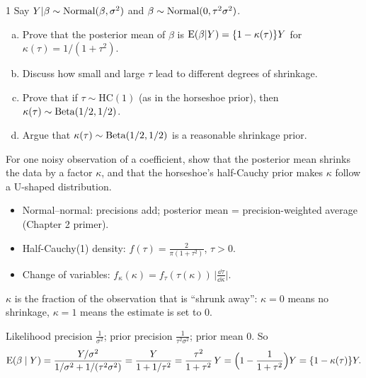 \documentclass[11pt]{article}
\begin{document}
\begin{problem}{1}
Say $Y|\beta\sim\mathrm{Normal}(\beta,\sigma^2)$ and $\beta\sim\mathrm{Normal}(0,\tau^2\sigma^2)$.
\begin{enumerate}[(a)]
\item Prove that the posterior mean of $\beta$ is $\mathrm{E}(\beta|Y)=\{1-\kappa(\tau)\}Y$ for $\kappa(\tau)=1/(1+\tau^2)$.
\item Discuss how small and large $\tau$ lead to different degrees of shrinkage.
\item Prove that if $\tau\sim\text{HC}(1)$ (as in the horseshoe prior), then $\kappa(\tau)\sim\mathrm{Beta}(1/2,1/2)$.
\item Argue that $\kappa(\tau)\sim\mathrm{Beta}(1/2,1/2)$ is a reasonable shrinkage prior.
\end{enumerate}
\end{problem}

\begin{restate}
For one noisy observation of a coefficient, show that the posterior mean shrinks the data by a factor $\kappa$, and that the horseshoe's half-Cauchy prior makes $\kappa$ follow a U-shaped distribution.
\end{restate}

\begin{recall}
\begin{itemize}
\item Normal--normal: precisions add; posterior mean = precision-weighted average (Chapter 2 primer).
\item Half-Cauchy(1) density: $f(\tau)=\frac{2}{\pi(1+\tau^2)}$, $\tau>0$.
\item Change of variables: $f_\kappa(\kappa)=f_\tau(\tau(\kappa))\,\big|\frac{\dd\tau}{\dd\kappa}\big|$.
\end{itemize}
\end{recall}

\begin{keyidea}
$\kappa$ is the fraction of the observation that is ``shrunk away'': $\kappa=0$ means no shrinkage, $\kappa=1$ means the estimate is set to 0.
\end{keyidea}

\solution
{}
Likelihood precision $\frac1{\sigma^2}$; prior precision $\frac1{\tau^2\sigma^2}$; prior mean 0. So
\[
\mathrm{E}(\beta\mid Y)=\frac{Y/\sigma^2}{1/\sigma^2+1/(\tau^2\sigma^2)}=\frac{Y}{1+1/\tau^2}=\frac{\tau^2}{1+\tau^2}\,Y=\Big(1-\frac1{1+\tau^2}\Big)Y=\{1-\kappa(\tau)\}Y.
\]
\end{document}
